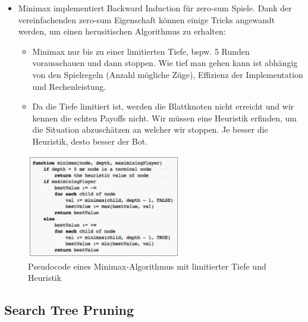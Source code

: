 \documentclass[a4paper]{article}
\begin{document}
		\begin{itemize}
			\item Minimax implementiert Backward Induction für zero-sum Spiele.
				Dank der vereinfachenden zero-sum Eigenschaft können einige Tricks angewandt werden, um einen herusitischen Algorithmus zu erhalten:
			\begin{itemize}
				\item Minimax nur bis zu einer limitierten Tiefe, bspw. 5 Runden vorausschauen und dann stoppen.
					Wie tief man gehen kann ist abhängig von den Spielregeln (Anzahl mögliche Züge), Effizienz der Implementation und Rechenleistung.
				\item Da die Tiefe limitiert ist, werden die Blattknoten nicht erreicht und wir kennen die echten Payoffs nicht.
					Wir müssen eine Heuristik erfinden, um die Situation abzuschätzen an welcher wir stoppen.
					Je besser die Heuristik, desto besser der Bot.
			\end{itemize}
		\end{itemize}
	
		\begin{figure}[htb!]
			\centering
			\includegraphics[width=0.6\textwidth]{img/01_sequential_games/minimax_pseudocode.png}
			\caption{Pseudocode eines Minimax-Algorithmus mit limitierter Tiefe und Heuristik}
			\label{fig:01_seq_minimax_pseudocode}
		\end{figure}
	
		\subsection{Search Tree Pruning}
		
\end{document}
